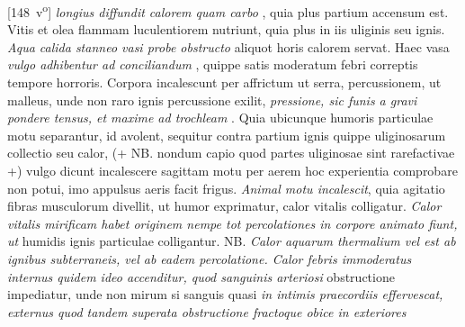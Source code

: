 %
[148~v\textsuperscript{o}]
\textit{longius diffundit calorem quam carbo }, quia plus partium accensum est. Vitis et olea flammam luculentiorem nutriunt, quia plus in iis uliginis seu ignis. \textit{Aqua calida stanneo vasi probe obstructo } aliquot horis calorem servat. Haec vasa \textit{vulgo adhibentur ad conciliandum }, quippe satis moderatum febri correptis tempore horroris\protect{}. Corpora incalescunt per affrictum ut serra, percussionem, ut malleus, unde non raro ignis percussione exilit, \textit{pressione, sic funis a gravi pondere tensus, et maxime ad trochleam\protect{} }. Quia ubicunque humoris particulae motu separantur, id avolent, sequitur contra partium ignis quippe uliginosarum collectio\protect{} seu calor, (+ NB. nondum capio quod partes uliginosae sint rarefactivae +) vulgo dicunt incalescere sagittam motu per aerem hoc experientia comprobare non potui, imo appulsus aeris facit frigus. \textit{Animal motu incalescit}, quia agitatio fibras musculorum\protect{} divellit, ut humor exprimatur, calor vitalis\protect{} colligatur. \textit{Calor vitalis mirificam habet originem nempe tot percolationes in corpore animato fiunt, ut } humidis ignis particulae colligantur. NB. \textit{Calor aquarum thermalium vel est ab ignibus subterraneis\protect{}, vel ab eadem percolatione\protect{}. Calor febris immoderatus internus quidem ideo accenditur, quod sanguinis arteriosi\protect{} }
obstructione impediatur, unde non mirum si sanguis quasi 
\textit{in intimis praecordiis effervescat, externus quod tandem superata obstructione fractoque obice in exteriores} 
